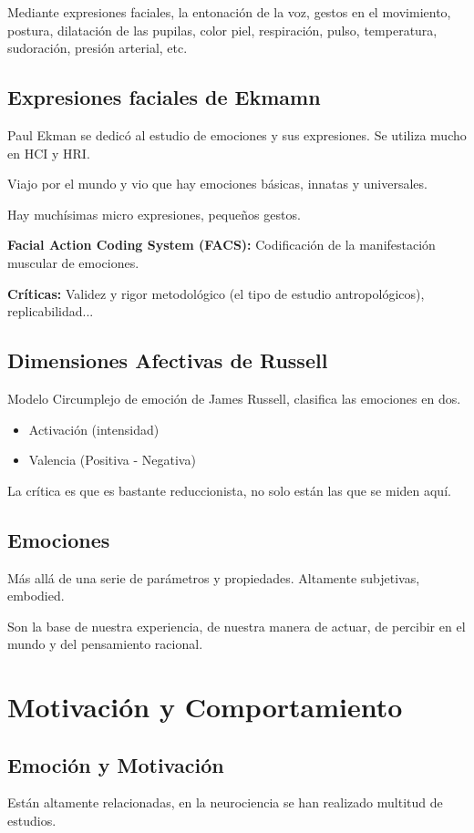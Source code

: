 \documentclass[12pt]{report} %
\begin{document}
Mediante expresiones faciales, la entonación de la voz, gestos en el movimiento, postura, dilatación de las pupilas, color piel, respiración, pulso, temperatura, sudoración, presión arterial, etc.

\subsection{Expresiones faciales de Ekmamn}
Paul Ekman se dedicó al estudio de emociones y sus expresiones. Se utiliza mucho en HCI y HRI.

Viajo por el mundo y vio que hay emociones básicas, innatas y universales.
  
Hay muchísimas micro expresiones, pequeños gestos.
  
\textbf{Facial Action Coding System (FACS):} Codificación de la manifestación muscular de emociones.
  
\textbf{Críticas:} Validez y rigor metodológico (el tipo de estudio antropológicos), replicabilidad...
  
\subsection{Dimensiones Afectivas de Russell}
Modelo Circumplejo de emoción de James Russell, clasifica las emociones en dos.
\begin{itemize}
  \item Activación (intensidad)
  \item Valencia (Positiva - Negativa)
\end{itemize}
La crítica es que es bastante reduccionista, no solo están las que se miden aquí.

\subsection{Emociones}
Más allá de una serie de parámetros y propiedades. Altamente subjetivas, embodied.

Son la base de nuestra experiencia, de nuestra manera de actuar, de percibir en el mundo y del pensamiento racional.

\section{Motivación y Comportamiento}
\subsection{Emoción y Motivación}
Están altamente relacionadas, en la neurociencia se han realizado multitud de estudios.
\end{document}
